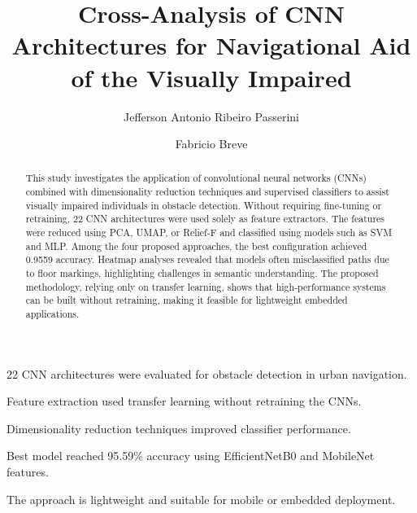 \documentclass[preprint,12pt]{elsarticle}
\begin{document}
\begin{frontmatter}



\title{Cross-Analysis of CNN Architectures for Navigational Aid of the Visually Impaired}


\author{Jefferson Antonio Ribeiro Passerini}
\author{Fabricio Breve}
\address{Institute of Geosciences and Exact Sciences,
	S\~{a}o Paulo State University (UNESP), Rio Claro, SP, 13506-900, Brazil}
	

\begin{abstract}
This study investigates the application of convolutional neural networks (CNNs) combined with dimensionality reduction techniques and supervised classifiers to assist visually impaired individuals in obstacle detection. Without requiring fine-tuning or retraining, 22 CNN architectures were used solely as feature extractors. The features were reduced using PCA, UMAP, or Relief-F and classified using models such as SVM and MLP. Among the four proposed approaches, the best configuration achieved 0.9559 accuracy. Heatmap analyses revealed that models often misclassified paths due to floor markings, highlighting challenges in semantic understanding. The proposed methodology, relying only on transfer learning, shows that high-performance systems can be built without retraining, making it feasible for lightweight embedded applications.
\end{abstract}

\begin{highlights}
	\item 22 CNN architectures were evaluated for obstacle detection in urban navigation.
	\item Feature extraction used transfer learning without retraining the CNNs.
	\item Dimensionality reduction techniques improved classifier performance.
	\item Best model reached 95.59\% accuracy using EfficientNetB0 and MobileNet features.
	\item The approach is lightweight and suitable for mobile or embedded deployment.
\end{highlights}



\end{frontmatter}
\end{document}
